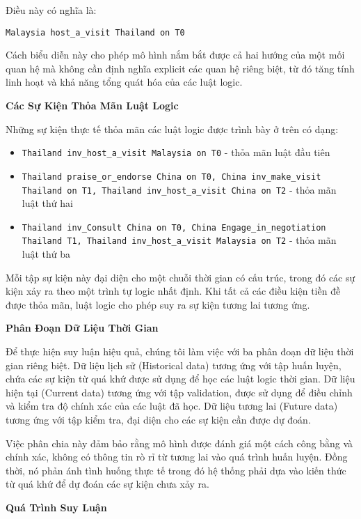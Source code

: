 Điều này có nghĩa là:
\begin{center}
\texttt{Malaysia host\_a\_visit Thailand on T0}
\end{center}

Cách biểu diễn này cho phép mô hình nắm bắt được cả hai hướng của một mối quan hệ mà không cần định nghĩa explicit các quan hệ riêng biệt, từ đó tăng tính linh hoạt và khả năng tổng quát hóa của các luật logic.

\textbf{Các Sự Kiện Thỏa Mãn Luật Logic}

Những sự kiện thực tế thỏa mãn các luật logic được trình bày ở trên có dạng:

\begin{itemize}
    \item \texttt{Thailand inv\_host\_a\_visit Malaysia on T0} - thỏa mãn luật đầu tiên
    \item \texttt{Thailand praise\_or\_endorse China on T0, China inv\_make\_visit Thailand on T1, Thailand inv\_host\_a\_visit China on T2} - thỏa mãn luật thứ hai
    \item \texttt{Thailand inv\_Consult China on T0, China Engage\_in\_negotiation Thailand T1, Thailand inv\_host\_a\_visit Malaysia on T2} - thỏa mãn luật thứ ba
\end{itemize}

Mỗi tập sự kiện này đại diện cho một chuỗi thời gian có cấu trúc, trong đó các sự kiện xảy ra theo một trình tự logic nhất định. Khi tất cả các điều kiện tiền đề được thỏa mãn, luật logic cho phép suy ra sự kiện tương lai tương ứng.

\textbf{Phân Đoạn Dữ Liệu Thời Gian}

Để thực hiện suy luận hiệu quả, chúng tôi làm việc với ba phân đoạn dữ liệu thời gian riêng biệt. Dữ liệu lịch sử (Historical data) tương ứng với tập huấn luyện, chứa các sự kiện từ quá khứ được sử dụng để học các luật logic thời gian. Dữ liệu hiện tại (Current data) tương ứng với tập validation, được sử dụng để điều chỉnh và kiểm tra độ chính xác của các luật đã học. Dữ liệu tương lai (Future data) tương ứng với tập kiểm tra, đại diện cho các sự kiện cần được dự đoán.

Việc phân chia này đảm bảo rằng mô hình được đánh giá một cách công bằng và chính xác, không có thông tin rò rỉ từ tương lai vào quá trình huấn luyện. Đồng thời, nó phản ánh tình huống thực tế trong đó hệ thống phải dựa vào kiến thức từ quá khứ để dự đoán các sự kiện chưa xảy ra.

\textbf{Quá Trình Suy Luận}

